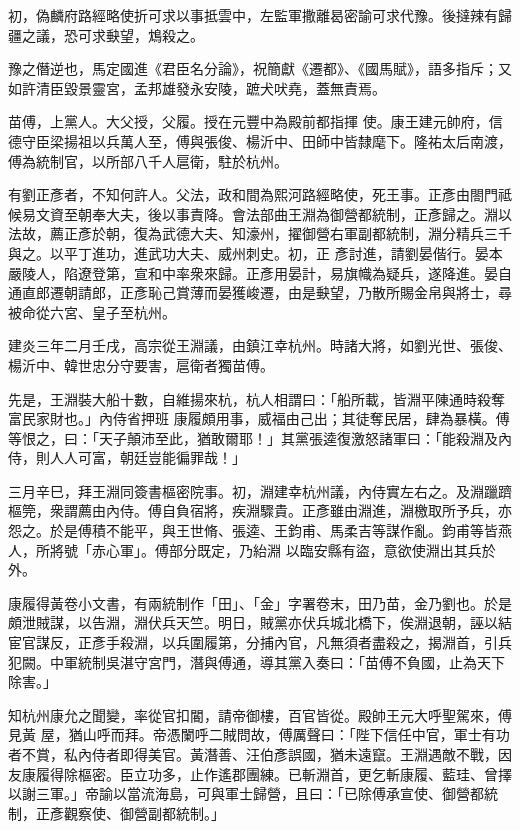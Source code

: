 \begin{pinyinscope}
 初，偽麟府路經略使折可求以事抵雲中，左監軍撒離曷密諭可求代豫。後撻辣有歸疆之議，恐可求𡙇望，鴆殺之。



 豫之僭逆也，馬定國進《君臣名分論》，祝簡獻《遷都》、《國馬賦》，語多指斥；又如許清臣毀景靈宮，孟邦雄發永安陵，蹠犬吠堯，蓋無責焉。



 苗傅，上黨人。大父授，父履。授在元豐中為殿前都指揮
 使。康王建元帥府，信德守臣梁揚祖以兵萬人至，傅與張俊、楊沂中、田師中皆隸麾下。隆祐太后南渡，傅為統制官，以所部八千人扈衛，駐於杭州。



 有劉正彥者，不知何許人。父法，政和間為熙河路經略使，死王事。正彥由閤門祗候易文資至朝奉大夫，後以事責降。會法部曲王淵為御營都統制，正彥歸之。淵以法故，薦正彥於朝，復為武德大夫、知濠州，擢御營右軍副都統制，淵分精兵三千與之。以平丁進功，進武功大夫、威州刺史。初，正
 彥討進，請劉晏偕行。晏本嚴陵人，陷遼登第，宣和中率衆來歸。正彥用晏計，易旗幟為疑兵，遂降進。晏自通直郎遷朝請郎，正彥恥己賞薄而晏獲峻遷，由是𡙇望，乃散所賜金帛與將士，尋被命從六宮、皇子至杭州。



 建炎三年二月壬戌，高宗從王淵議，由鎮江幸杭州。時諸大將，如劉光世、張俊、楊沂中、韓世忠分守要害，扈衛者獨苗傅。



 先是，王淵裝大船十數，自維揚來杭，杭人相謂曰：「船所載，皆淵平陳通時殺奪富民家財也。」內侍省押班
 康履頗用事，威福由己出；其徒奪民居，肆為暴橫。傅等恨之，曰：「天子顛沛至此，猶敢爾耶！」其黨張逵復激怒諸軍曰：「能殺淵及內侍，則人人可富，朝廷豈能徧罪哉！」



 三月辛巳，拜王淵同簽書樞密院事。初，淵建幸杭州議，內侍實左右之。及淵躐躋樞筦，衆謂薦由內侍。傅自負宿將，疾淵驟貴。正彥雖由淵進，淵檄取所予兵，亦怨之。於是傅積不能平，與王世脩、張逵、王鈞甫、馬柔吉等謀作亂。鈞甫等皆燕人，所將號「赤心軍」。傅部分既定，乃紿淵
 以臨安縣有盜，意欲使淵出其兵於外。



 康履得黃卷小文書，有兩統制作「田」、「金」字署卷末，田乃苗，金乃劉也。於是頗泄賊謀，以告淵，淵伏兵天竺。明日，賊黨亦伏兵城北橋下，俟淵退朝，誣以結宦官謀反，正彥手殺淵，以兵圍履第，分捕內官，凡無須者盡殺之，揭淵首，引兵犯闕。中軍統制吳湛守宮門，潛與傅通，導其黨入奏曰：「苗傅不負國，止為天下除害。」



 知杭州康允之聞變，率從官扣閽，請帝御樓，百官皆從。殿帥王元大呼聖駕來，傅見黃
 屋，猶山呼而拜。帝憑闌呼二賊問故，傅厲聲曰：「陛下信任中官，軍士有功者不賞，私內侍者即得美官。黃潛善、汪伯彥誤國，猶未遠竄。王淵遇敵不戰，因友康履得除樞密。臣立功多，止作遙郡團練。已斬淵首，更乞斬康履、藍珪、曾擇以謝三軍。」帝諭以當流海島，可與軍士歸營，且曰：「已除傅承宣使、御營都統制，正彥觀察使、御營副都統制。」




\end{pinyinscope}
